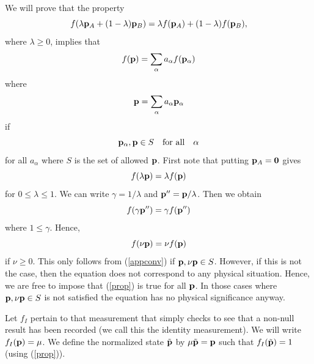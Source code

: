 \documentclass[10pt,twocolumn]{article}
\begin{document}
\vspace{6mm}


\vspace{6mm}

We will prove that the property
\begin{equation}\label{appconv}
f(\lambda {\bf p}_A + (1-\lambda) {\bf p}_B)=
\lambda f({\bf p}_A) + (1-\lambda) f({\bf p}_B),
\end{equation}
where $\lambda\geq 0$, implies that
\begin{equation}\label{linearproperty}
f({\bf p})=\sum_\alpha a_\alpha f({\bf p}_\alpha)
\end{equation}
where
\begin{equation}\label{palphastate}
{\bf p}=\sum_\alpha a_\alpha {\bf p}_\alpha
\end{equation}
if
\[ {\bf p}_\alpha, {\bf p}\in S  ~~~{\rm for~all}~~~ \alpha\]
for all $a_\alpha$ where $S$ is the set of allowed ${\bf p}$.
First note that putting ${\bf p}_A={\bf 0}$ gives
\begin{equation}
f(\lambda {\bf p})=\lambda f({\bf p})
\end{equation}
for $ 0\leq \lambda \leq 1$.  We can write $\gamma=1/\lambda$ and ${\bf
p}'' = {\bf p}/\lambda$.  Then we obtain
\begin{equation}
f(\gamma {\bf p}'')=\gamma f({\bf p}'')
\end{equation}
where $1\leq\gamma$.  Hence,
\begin{equation} \label{prop}
f(\nu {\bf p})=\nu f({\bf p})
\end{equation}
if $ \nu \geq 0$.  This only follows from (\ref{appconv}) if ${\bf p}, \nu{\bf
p} \in S$.  However, if this is not the case, then the equation does not
correspond to any physical situation. Hence, we are free to impose that
(\ref{prop}) is true for all ${\bf p}$.  In those cases where
${\bf p}, \nu{\bf p} \in S$ is not satisfied the equation has no
physical significance anyway.

Let $f_I$ pertain to that measurement that simply checks to see that a
non-null result has been recorded (we call this the identity
measurement). We will
write $f_I({\bf p})=\mu$.  We define the normalized state $\tilde{\bf
p}$ by $\mu\tilde{\bf p}={\bf p}$ such that $f_I(\tilde{\bf p})=1$
(using (\ref{prop})).
\end{document}
